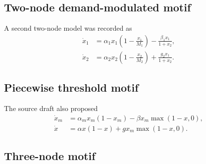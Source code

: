 \documentclass[11pt, reqno]{amsart}
\theoremstyle{definition}
\theoremstyle{remark}
\begin{document}
	
	\subsection{Two-node demand-modulated motif}
	
	A second two-node model was recorded as
	\begin{equation}
		\label{eq:two-node-demand}
		\begin{aligned}
			\dot x_1
			&=
			\alpha_1x_1\left(1-\frac{x_1}{M_1}\right)
			-\frac{\beta_1x_1}{1+x_2},\\
			\dot x_2
			&=
			\alpha_2x_2\left(1-\frac{x_2}{M_2}\right)
			+\frac{g_2x_1}{1+x_2}.
		\end{aligned}
	\end{equation}
	
	
	\subsection{Piecewise threshold motif}
	
	The source draft also proposed
	\begin{equation}
		\label{eq:two-node-threshold}
		\begin{aligned}
			\dot x_m
			&=
			\alpha_mx_m(1-x_m)
			-\beta x_m\max(1-x,0),\\
			\dot x
			&=
			\alpha x(1-x)
			+g x_m\max(1-x,0).
		\end{aligned}
	\end{equation}
	
	
	\subsection{Three-node motif}
	
\end{document}
